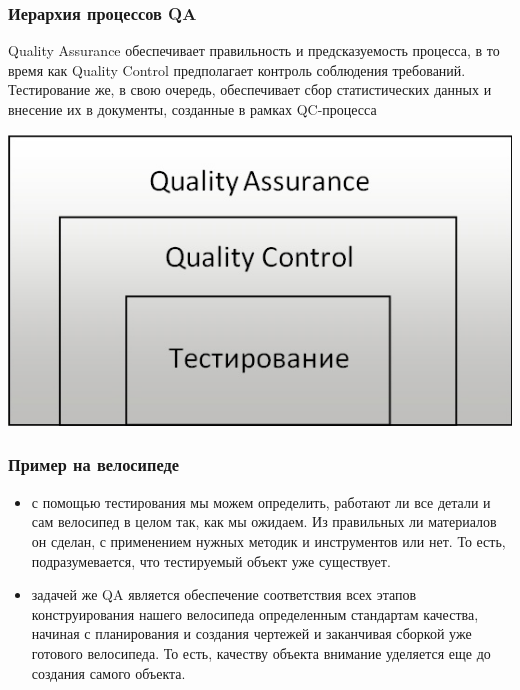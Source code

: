 \documentclass{../industrial-development}
\begin{document}
\begin{frame} \frametitle{Иерархия процессов QA}
\begin{flushleft}
Quality Assurance обеспечивает правильность и предсказуемость процесса, в то время как Quality Control предполагает контроль соблюдения требований. Тестирование же, в свою очередь, обеспечивает сбор статистических данных и внесение их в документы, созданные в рамках QC-процесса
\end{flushleft}
\centerline{\includegraphics[height=0.7\textheight]{QA_QC2.png}}
\end{frame}

\begin{frame} \frametitle{Пример на велосипеде}
\begin{itemize}
\item с помощью тестирования мы можем определить, работают ли все детали и сам велосипед в целом так, как мы ожидаем. Из правильных ли материалов он сделан, с применением нужных методик и инструментов или нет. То есть, подразумевается, что тестируемый объект уже существует.
\item задачей же QA является обеспечение соответствия всех этапов конструирования нашего велосипеда определенным стандартам качества, начиная с планирования и создания чертежей и заканчивая сборкой уже готового велосипеда. То есть, качеству объекта внимание уделяется еще до создания самого объекта.
\end{itemize}
\end{frame}
\end{document}
